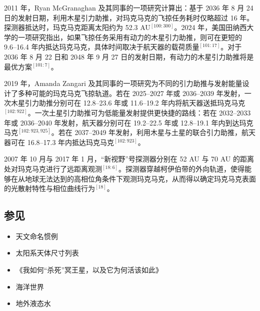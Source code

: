 2011 年，Ryan McGranaghan 及其同事的一项研究计算出：基于 2036 年 8 月 24 日的发射日期，利用木星引力助推，对玛克马克的飞掠任务耗时仅略超过 16 年。探测器抵达时，玛克马克距离太阳约为 52.3 AU$^{[100:300]}$。2024 年，美国田纳西大学的一项研究指出，如果飞掠任务采用有动力的木星引力助推，则可在更短的 9.6–16.4 年内抵达玛克马克，具体时间取决于航天器的载荷质量$^{[101:17]}$。对于 2036 年 8 月 22 日和 2048 年 9 月 27 日的发射日期，有动力的木星引力助推将是最优方案$^{[101:7]}$。

2019 年，Amanda Zangari 及其同事的一项研究为不同的引力助推与发射能量设计了多种可能的玛克马克飞掠轨道。若在 2025–2027 年或 2036–2039 年发射，一次木星引力助推分别可在 12.8–23.6 年或 11.6–19.2 年内将航天器送抵玛克马克$^{[102:922]}$。一次土星引力助推可为低能量发射提供更快捷的路线：若在 2032–2033 年或 2036–2040 年发射，航天器分别可在 19.2–22.5 年或 12.8–19.1 年内到达玛克马克$^{[102:923,925]}$。若在 2037–2049 年发射，利用木星与土星的联合引力助推，航天器可在 16.8–17.3 年内抵达玛克马克$^{[102:923]}$。

2007 年 10 月与 2017 年 1 月，“新视野”号探测器分别在 52 AU 与 70 AU 的距离处对玛克马克进行了远距离观测$^{[18:6]}$。探测器穿越柯伊伯带的外向轨道，使得能够在从地球无法达到的高相位角条件下观测玛克马克，从而得以确定玛克马克表面的光散射特性与相位曲线行为$^{[18]}$。
\subsection{参见}
\begin{itemize}
\item 天文命名惯例
\item 太阳系天体尺寸列表
\item 《我如何“杀死”冥王星，以及它为何活该如此》
\item 海洋世界
\item 地外液态水
\end{itemize}
